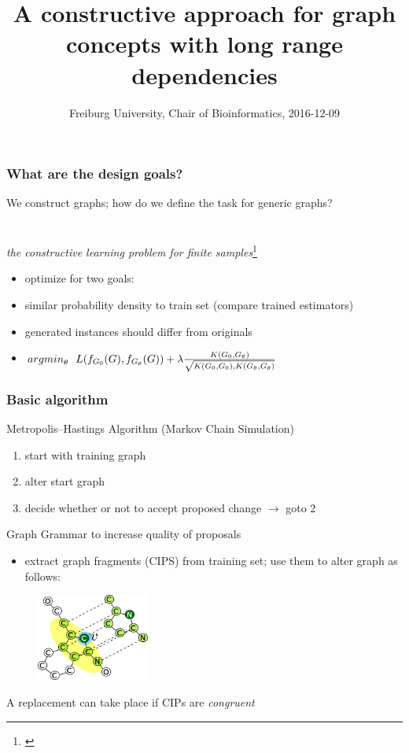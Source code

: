\documentclass{beamer}
\title 
{A constructive approach for graph concepts
with long range dependencies}
\author %
{\underline{Stefan Mautner} \and Fabrizio Costa
    \href{mailto:mautner@informatik.uni-freiburg.de}
        {mautner@informatik.uni-freiburg.de} 
    \href{mailto:costa@informatik.uni-freiburg.de}
        {costa@informatik.uni-freiburg.de}
}
\date 
{Freiburg University, Chair of Bioinformatics, 2016-12-09}
\begin{document}
\frame{\titlepage}



\begin{frame}
\frametitle{What are the design goals?}

    We construct graphs; how do we define the task for generic graphs?
    ~\\
    ~\\
    ~\\
    \emph{the constructive learning problem for finite samples}\footnote{\cite{costa16}}
    ~\\
    \begin{itemize}
        \item optimize for two goals:
        \item similar probability density to train set (compare trained estimators)
        \item generated instances should  differ from originals
        \item ${argmin}_{\theta}~~L(f_{G_0}(G),f_{G_{\theta}}(G))+
            \lambda{{K(G_0,G_{\theta})}\over{\sqrt{K(G_0,G_0),K(G_{\theta},G_{\theta})}}} $
    \end{itemize}
\end{frame}


\begin{frame}
    \frametitle{Basic algorithm}
    Metropolis--Hastings Algorithm (Markov Chain Simulation)
    \begin{enumerate}
        \item start with training graph
        \item alter start graph
        \item decide whether or not to accept proposed change $\rightarrow$ goto 2
    \end{enumerate}
    \pause
    Graph Grammar to increase quality of proposals
    \begin{itemize}
        \item extract graph fragments (CIPS) from training set;
            use them to alter graph as follows:
    \end{itemize}
    \begin{figure}[ht]
        \centering
        \includegraphics[width=0.33\textwidth]{images/CIP_replacement.png}
    \end{figure}
    \small{A replacement can take place if CIPs are \emph{congruent}  }
\end{frame}
\end{document}

